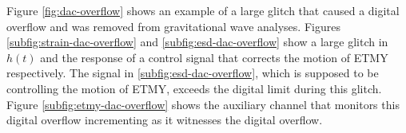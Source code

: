 Figure \ref{fig:dac-overflow} shows an example of a large glitch that caused 
a digital overflow and was removed from gravitational wave analyses. Figures 
\ref{subfig:strain-dac-overflow} and \ref{subfig:esd-dac-overflow} show a 
large glitch in $h(t)$ and the response of a control signal that corrects  
the motion of ETMY respectively. The signal in \ref{subfig:esd-dac-overflow}, 
which is supposed to be controlling the motion of ETMY, exceeds the digital 
limit during this glitch. Figure \ref{subfig:etmy-dac-overflow} shows the 
auxiliary channel that monitors this digital overflow incrementing as 
it witnesses the digital overflow. 

\begin{figure}[ht!]%
\centering
{}


\end{figure}
